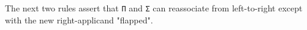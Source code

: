 \documentclass[authoryear, acmsmall, screen, review, nonacm]{acmart}
\begin{document}
\Ni The next two rules assert that \verb!Π! and \verb!Σ! can reassociate from left-to-right except with the new right-applicand "flapped".
\begin{code} %
%
\>[4]\AgdaSpace{}%
\AgdaSymbol{:}\AgdaSpace{}%
\AgdaSpace{}%
\AgdaSymbol{\{}\AgdaSpace{}%
\AgdaSymbol{:}\AgdaSpace{}%
\AgdaSpace{}%
\AgdaSpace{}%
\AgdaSymbol{(}\AgdaOperator{\AgdaInductiveConstructor{R[}}\AgdaSpace{}%
\AgdaSpace{}%
\AgdaSpace{}%
\AgdaSpace{}%
\AgdaOperator{\AgdaInductiveConstructor{]}}\AgdaSymbol{)\}}\AgdaSpace{}%
\AgdaSymbol{\{}\AgdaSpace{}%
\AgdaSymbol{:}\AgdaSpace{}%
\AgdaSpace{}%
\AgdaSpace{}%
\AgdaSymbol{\}}\AgdaSpace{}%
\AgdaSymbol{\{}\AgdaSpace{}%
\AgdaSymbol{:}\AgdaSpace{}%
\AgdaSpace{}%
\AgdaSymbol{(}\AgdaSpace{}%
\AgdaSymbol{)\}}\AgdaSpace{}%
\<%
\\
\>[4][@{}l@{\AgdaIndent{0}}]%
\>[8]\AgdaSymbol{(}\AgdaSpace{}%
\AgdaSymbol{\{}\AgdaSpace{}%
\AgdaSymbol{=}\AgdaSpace{}%
\AgdaSymbol{\}}\AgdaSpace{}%
\AgdaSpace{}%
\AgdaSymbol{)}\AgdaSpace{}%
\AgdaSpace{}%
\AgdaSpace{}%
\AgdaSpace{}%
\AgdaSpace{}%
\AgdaSymbol{\{}\AgdaSpace{}%
\AgdaSymbol{=}\AgdaSpace{}%
\AgdaSymbol{\}}\AgdaSpace{}%
\AgdaSpace{}%
\AgdaSymbol{(}\AgdaSpace{}%
\AgdaSpace{}%
\AgdaSymbol{)}\<%
\\
%
\>[4]\AgdaSpace{}%
\AgdaSymbol{:}\AgdaSpace{}%
\AgdaSpace{}%
\AgdaSymbol{\{}\AgdaSpace{}%
\AgdaSymbol{:}\AgdaSpace{}%
\AgdaSpace{}%
\AgdaSpace{}%
\AgdaSymbol{(}\AgdaOperator{\AgdaInductiveConstructor{R[}}\AgdaSpace{}%
\AgdaSpace{}%
\AgdaSpace{}%
\AgdaSpace{}%
\AgdaOperator{\AgdaInductiveConstructor{]}}\AgdaSymbol{)\}}\AgdaSpace{}%
\AgdaSymbol{\{}\AgdaSpace{}%
\AgdaSymbol{:}\AgdaSpace{}%

\end{code}
\end{document}

